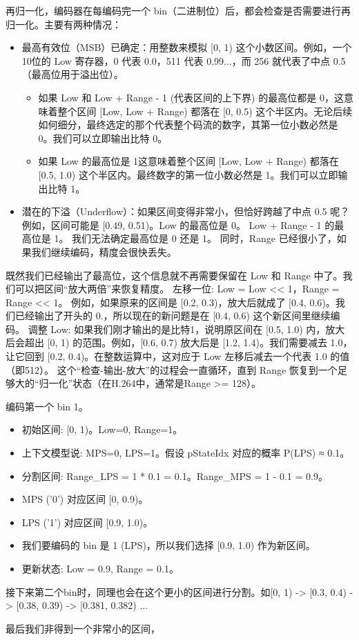 \documentclass{/Users/hi/Study/template/code}
\begin{document}
再归一化，编码器在每编码完一个 bin（二进制位）后，都会检查是否需要进行再归一化。主要有两种情况：
\begin{itemize}
	\item 最高有效位（MSB）已确定：用整数来模拟 [0, 1) 这个小数区间。例如，一个10位的 Low 寄存器，0 代表 0.0，511 代表 0.99...，而 256 就代表了中点 0.5（最高位用于溢出位）。
	      \begin{itemize}
		      \item 如果 Low 和 Low + Range - 1 (代表区间的上下界) 的最高位都是 0，这意味着整个区间 [Low, Low + Range) 都落在 [0, 0.5) 这个半区内。无论后续如何细分，最终选定的那个代表整个码流的数字，其第一位小数必然是 0。我们可以立即输出比特 0。
		      \item 如果 Low 的最高位是 1这意味着整个区间 [Low, Low + Range) 都落在 [0.5, 1.0) 这个半区内。最终数字的第一位小数必然是 1。我们可以立即输出比特 1。
	      \end{itemize}
	\item 潜在的下溢（Underflow）：如果区间变得非常小，但恰好跨越了中点 0.5 呢？例如，区间可能是 [0.49, 0.51)。Low 的最高位是 0。
	      Low + Range - 1 的最高位是 1。
	      我们无法确定最高位是 0 还是 1。
	      同时，Range 已经很小了，如果我们继续编码，精度会很快丢失。

\end{itemize}
既然我们已经输出了最高位，这个信息就不再需要保留在 Low 和 Range 中了。我们可以把区间“放大两倍”来恢复精度。
左移一位: Low = Low << 1，Range = Range << 1。
例如，如果原来的区间是 [0.2, 0.3)，放大后就成了 [0.4, 0.6)。我们已经输出了开头的 0.，所以现在的新问题是在 [0.4, 0.6) 这个新区间里继续编码。
调整 Low: 如果我们刚才输出的是比特1，说明原区间在 [0.5, 1.0) 内，放大后会超出 [0, 1) 的范围。例如，[0.6, 0.7) 放大后是 [1.2, 1.4)。我们需要减去 1.0，让它回到 [0.2, 0.4)。在整数运算中，这对应于 Low 左移后减去一个代表 1.0 的值（即512）。
这个“检查-输出-放大”的过程会一直循环，直到 Range 恢复到一个足够大的“归一化”状态（在H.264中，通常是Range >= 128）。

\begin{tcolorbox}
	\small
	编码第一个 bin 1。
	\begin{itemize}
		\item 初始区间: [0, 1)。Low=0, Range=1。
		\item 上下文模型说: MPS=0, LPS=1。假设 pStateIdx 对应的概率 P(LPS) ≈ 0.1。
		\item 分割区间: Range\_LPS = 1 * 0.1 = 0.1。Range\_MPS = 1 - 0.1 = 0.9。
		\item MPS ('0') 对应区间 [0, 0.9)。
		\item LPS ('1') 对应区间 [0.9, 1.0)。
		\item 我们要编码的 bin 是 1 (LPS)，所以我们选择 [0.9, 1.0) 作为新区间。
		\item 更新状态: Low = 0.9, Range = 0.1。
	\end{itemize}
	接下来第二个bin时，同理也会在这个更小的区间进行分割。如[0, 1) -> [0.3, 0.4) -> [0.38, 0.39) -> [0.381, 0.382) ...
\end{tcolorbox}
最后我们非得到一个非常小的区间，
\end{document}
